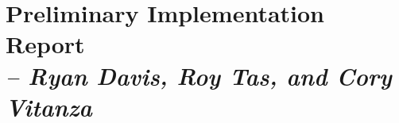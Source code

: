 \chapter{Preliminary Implementation Report \\
\small{\textit{-- Ryan Davis, Roy Tas, and Cory Vitanza}}
\label{Chapter::PreliminaryImplementation}}

